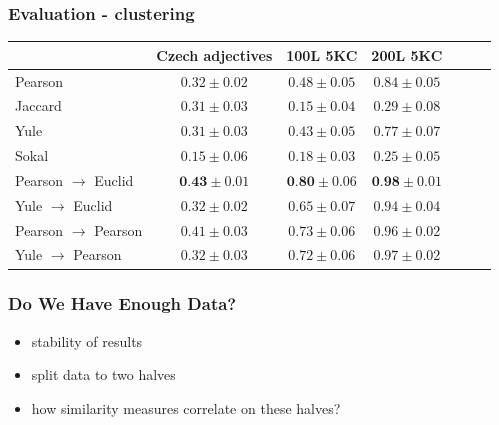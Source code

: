 \documentclass[xcolor=svgnames]{beamer}
\begin{document}
\begin{frame}
    \frametitle{Evaluation - clustering}
    \begin{tabular}{lcccccc}
        \toprule
                                   & Czech adjectives           &  100L 5KC             & 200L 5KC             \\
        \midrule

        Pearson                       & $        0.32 \pm 0.02$ &  $        0.48 \pm 0.05$ & $        0.84 \pm 0.05$ \\
        Jaccard                       & $        0.31 \pm 0.03$ &  $        0.15 \pm 0.04$ & $        0.29 \pm 0.08$ \\
        Yule                          & $        0.31 \pm 0.03$ &  $        0.43 \pm 0.05$ & $        0.77 \pm 0.07$ \\
        Sokal                         & $        0.15 \pm 0.06$ &  $        0.18 \pm 0.03$ & $        0.25 \pm 0.05$ \\
        Pearson $\rightarrow$ Euclid  & $\textbf{0.43}\pm 0.01$ &  $\textbf{0.80}\pm 0.06$ & $\textbf{0.98}\pm 0.01$ \\
        Yule    $\rightarrow$ Euclid  & $        0.32 \pm 0.02$ &  $        0.65 \pm 0.07$ & $        0.94 \pm 0.04$ \\
        Pearson $\rightarrow$ Pearson & $        0.41 \pm 0.03$ &  $        0.73 \pm 0.06$ & $        0.96 \pm 0.02$ \\
        Yule    $\rightarrow$ Pearson & $        0.32 \pm 0.03$ &  $        0.72 \pm 0.06$ & $        0.97 \pm 0.02$ \\
      \bottomrule
    \end{tabular}
\end{frame}
\begin{frame}
    \frametitle{Do We Have Enough Data?}
    \begin{itemize}
        \item stability of results
        \item split data to two halves
        \item how similarity measures correlate on these halves?
    \end{itemize}
\end{frame}
\end{document}
